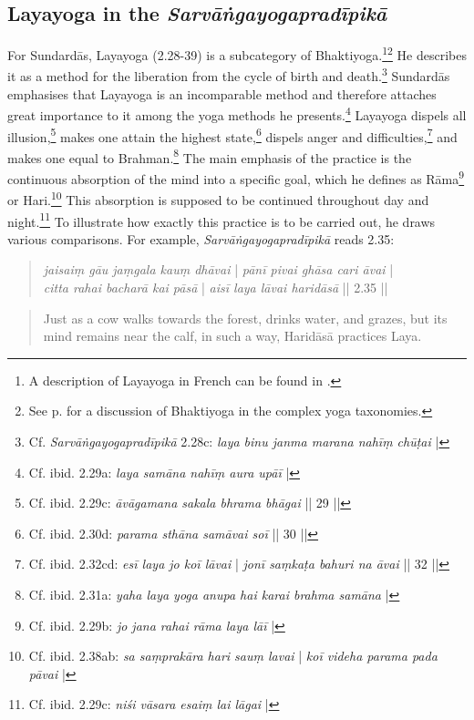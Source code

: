 \subsection{Layayoga in the \textit{Sarvāṅgayogapradīpikā}}
\label{layaintrosarvanga}
For Sundardās, Layayoga (2.28-39) is a subcategory of Bhaktiyoga.\footnote{A description of Layayoga in French can be found in \citeauthor[2014: 693-94]{burger2014sarvangayogapradipika}.}\footnote{See p.\pageref{bhaktiyogaintro} for a discussion of Bhaktiyoga in the complex yoga taxonomies.} He describes it as a method for the liberation from the cycle of birth and death.\footnote{Cf. \textit{Sarvāṅgayogapradīpikā} 2.28c: \textit{laya binu janma marana nahīṃ chūṭai} |} Sundardās emphasises that Layayoga is an incomparable method and therefore attaches great importance to it among the yoga methods he presents.\footnote{Cf. ibid. 2.29a: \textit{laya samāna nahīṃ aura upāī} |} Layayoga dispels all illusion,\footnote{Cf. ibid. 2.29c: \textit{āvāgamana sakala bhrama bhāgai} || 29 ||} makes one attain the highest state,\footnote{Cf. ibid. 2.30d: \textit{parama sthāna samāvai soī} || 30 ||} dispels anger and difficulties,\footnote{Cf. ibid. 2.32cd: \textit{esī laya jo koī lāvai} | \textit{jonī saṃkaṭa bahuri na āvai} || 32 ||} and makes one equal to Brahman.\footnote{Cf. ibid. 2.31a: \textit{yaha laya yoga anupa hai karai brahma samāna} |} The main emphasis of the practice is the continuous absorption of the mind into a specific goal, which he defines as Rāma\footnote{Cf. ibid. 2.29b: \textit{jo jana rahai rāma laya lāī} |} or Hari.\footnote{Cf. ibid. 2.38ab: \textit{sa saṃprakāra hari sauṃ lavai} | \textit{koī videha parama pada pāvai} |} This absorption is supposed to be continued throughout day and night.\footnote{Cf. ibid. 2.29c: \textit{niśi vāsara esaiṃ lai lāgai} |} To illustrate how exactly this practice is to be carried out, he draws various comparisons. For example, \textit{Sarvāṅgayogapradīpikā} reads 2.35: 

\begin{quote}
\textit{jaisaiṃ gāu jaṃgala kauṃ dhāvai} | \textit{pānī pivai ghāsa cari āvai} |\\ 
\textit{citta rahai bacharā kai pāsā} | \textit{aisī laya lāvai haridāsā} || 2.35 ||
\end{quote}
\begin{quote}
  Just as a cow walks towards the forest, drinks water, and grazes, but its mind remains near the calf, in such a way, Haridāsā practices Laya.
\end{quote}

